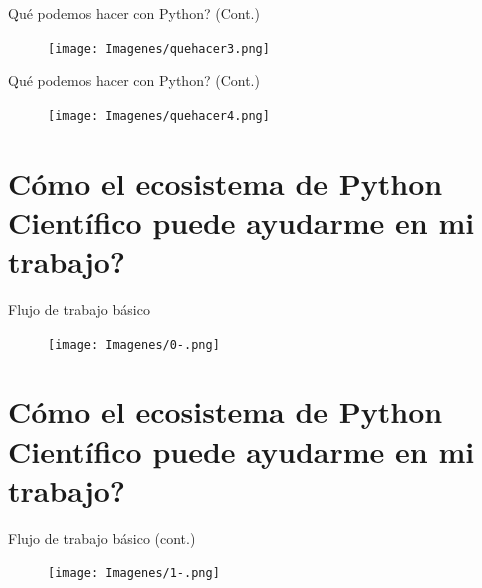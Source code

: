 \documentclass[bigger]{beamer}
\begin{document}
\begin{frame}{Qu\'e podemos hacer con Python? (Cont.)}

 \begin{figure}[h]
        \texttt{[image: Imagenes/quehacer3.png]}
\end{figure}
\end{frame}


\begin{frame}{Qu\'e podemos hacer con Python? (Cont.)}

 \begin{figure}[h]
        \texttt{[image: Imagenes/quehacer4.png]}
\end{figure}
\end{frame}


\section{Cómo el ecosistema de Python Científico puede ayudarme en mi trabajo?}
\begin{frame}{Flujo de trabajo básico}
 \begin{figure}[h]
        \texttt{[image: Imagenes/0-.png]}
\end{figure}
\end{frame}
\section{Cómo el ecosistema de Python Científico puede ayudarme en mi trabajo?}
\begin{frame}{Flujo de trabajo básico (cont.)}
 \begin{figure}[h]
        \texttt{[image: Imagenes/1-.png]}
\end{figure}
\end{frame}
\end{document}
